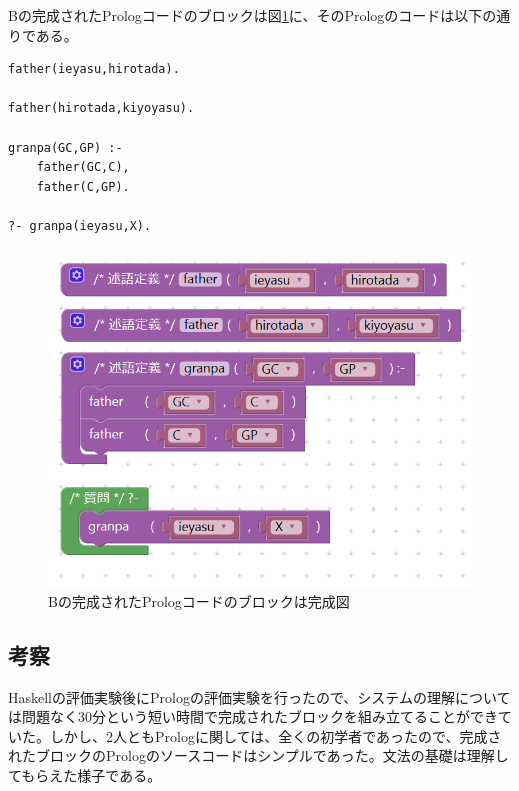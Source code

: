 \documentclass{risepaper}
\begin{document}
\begin{itemize}
Bの完成されたPrologコードのブロックは図\ref{fig:prolog_experiment_result_b}に、そのPrologのコードは以下の通りである。
\begin{lstlisting}[basicstyle=\ttfamily\footnotesize]
father(ieyasu,hirotada).

father(hirotada,kiyoyasu).

granpa(GC,GP) :-
    father(GC,C),
    father(C,GP).

?- granpa(ieyasu,X).
\end{lstlisting}

\begin{figure}[h]
\begin{center}
\includegraphics[scale=0.5]{img/prolog_experiment_result_b.PNG}
\caption{Bの完成されたPrologコードのブロックは完成図}%
\label{fig:prolog_experiment_result_b}
\end{center}%
\end{figure}%

\end{itemize} 
        
		\subsection{考察}
        
Haskellの評価実験後にPrologの評価実験を行ったので、システムの理解については問題なく30分という短い時間で完成されたブロックを組み立てることができていた。しかし、2人ともPrologに関しては、全くの初学者であったので、完成されたブロックのPrologのソースコードはシンプルであった。文法の基礎は理解してもらえた様子である。
\end{document}
